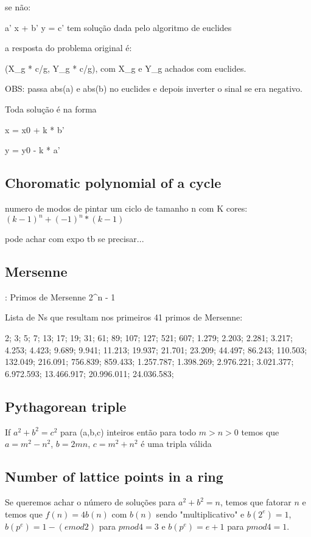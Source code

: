 \documentclass{article}
\begin{document}
se não:

a' x + b' y = c' tem solução dada pelo algoritmo de euclides

a resposta do problema original é:

(X_g * c/g, Y_g * c/g), com X_g e Y_g achados com euclides.

OBS: passa abs(a) e abs(b) no euclides e depois inverter o sinal
se era negativo.

Toda solução é na forma

x = x0 + k * b'

y = y0 - k * a'

\subsection{Choromatic polynomial of a cycle}

numero de modos de pintar um ciclo de tamanho n com K cores: $(k-1)^n + (-1)^n * ( k-1 )$

pode achar com expo tb se precisar...


\subsection{Mersenne}:
Primos de Mersenne 2^n - 1

Lista de Ns que resultam nos primeiros 41 primos de Mersenne:

2; 3; 5; 7; 13; 17; 19; 31; 61; 89; 107; 127; 521; 607; 1.279; 2.203; 2.281; 3.217; 4.253; 4.423; 9.689; 9.941; 11.213; 19.937; 21.701; 23.209; 44.497; 86.243; 110.503; 132.049; 216.091; 756.839; 859.433; 1.257.787; 1.398.269; 2.976.221; 3.021.377; 6.972.593; 13.466.917; 20.996.011; 24.036.583;


\subsection{Pythagorean triple}
If $a^2 +  b^2 = c^2$ para (a,b,c) inteiros então para todo $m>n>0$ temos que $a = m^2 - n^2$, $b=2mn$, $c = m^2 + n^2$ é uma tripla válida

\subsection{Number of lattice points in a ring}
Se queremos achar o número de soluções para $a^2 + b^2 = n$, temos que fatorar $n$ e temos que $f(n) = 4b(n)$ com $b(n)$ sendo "multiplicativo" e $b(2^e) = 1$, $b(p^e) = 1 - (e mod 2)$ para $p mod 4 = 3$ e $b(p^e) = e+1$ para $p mod 4 = 1$.
\end{document}
